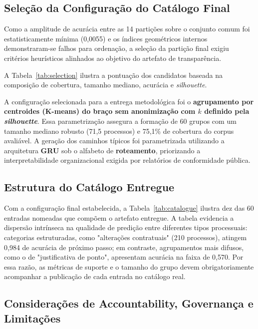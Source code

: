 \subsection{Seleção da Configuração do Catálogo Final}\label{sec:selecao}

Como a amplitude de acurácia entre as 14 partições sobre o conjunto comum foi estatisticamente mínima (0,0055) e os índices geométricos internos demonstraram-se falhos para ordenação, a seleção da partição final exigiu critérios heurísticos alinhados ao objetivo do artefato de transparência.

A Tabela~\ref{tab:selection} ilustra a pontuação dos candidatos baseada na composição de cobertura, tamanho mediano, acurácia e \emph{silhouette}.



A configuração selecionada para a entrega metodológica foi o \textbf{agrupamento por centroides (K-means) do braço sem anonimização com $k$ definido pela \emph{silhouette}}. Essa parametrização assegura a formação de 60 grupos com um tamanho mediano robusto (71,5 processos) e 75,1\% de cobertura do corpus avaliável. A geração dos caminhos típicos foi parametrizada utilizando a arquitetura \textbf{GRU} sob o alfabeto de \textbf{roteamento}, priorizando a interpretabilidade organizacional exigida por relatórios de conformidade pública.

\subsection{Estrutura do Catálogo Entregue}\label{sec:res-entrada}

Com a configuração final estabelecida, a Tabela~\ref{tab:catalogue} ilustra dez das 60 entradas nomeadas que compõem o artefato entregue. A tabela evidencia a dispersão intrínseca na qualidade de predição entre diferentes tipos processuais: categorias estruturadas, como "alterações contratuais" (210 processos), atingem 0,984 de acurácia de próximo passo; em contraste, agrupamentos mais difusos, como o de "justificativa de ponto", apresentam acurácia na faixa de 0,570. Por essa razão, as métricas de suporte e o tamanho do grupo devem obrigatoriamente acompanhar a publicação de cada entrada no catálogo real.



\subsection{Considerações de Accountability, Governança e Limitações}\label{sec:res-accountability}

